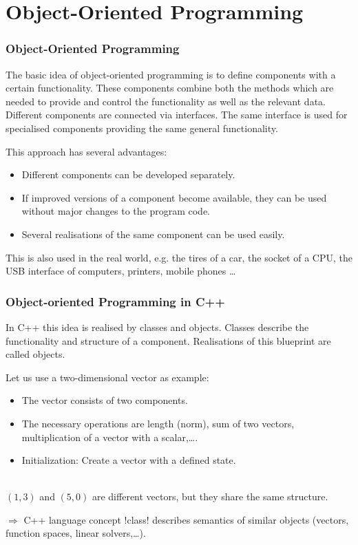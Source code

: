 \section{Object-Oriented Programming}

\begin{frame}
\frametitle<presentation>{Object-Oriented Programming}
The basic idea of object-oriented programming is to define components with a certain functionality. These components combine both the methods which are needed to provide and control the functionality as well as the relevant data. Different components are connected via interfaces. The same interface is used for specialised components providing the same general functionality.

This approach has several advantages:
\begin{itemize}
\item Different components can be developed separately.
\item If improved versions of a component become available, they can be used without major changes to the program code.
\item Several realisations of the same component can be used easily.
\end{itemize}

This is also used in the real world, e.g. the tires of a car, the socket of a CPU, the USB interface of computers, printers, mobile phones \dots
\end{frame}

\begin{frame}
\frametitle{Object-oriented Programming in C++}
In C++ this idea is realised by classes and objects. Classes describe the functionality and structure of a component. Realisations of this blueprint are called objects. 

Let us use a two-dimensional vector as example:
\begin{itemize}
\item The vector consists of two components.
\item The necessary operations are length (norm), sum of two vectors, multiplication of a vector with a scalar,\dots.
\item Initialization: Create a vector with a defined state.
\end{itemize}\ \\
$(1,3)$ and $(5,0)$ are different vectors, but they share the same structure.\\
\pause
\begin{block}{$\Rightarrow$ C++ language concept}
\inline!class! describes semantics of similar objects (vectors, function spaces, linear solvers,\dots).
\end{block}
\end{frame}

